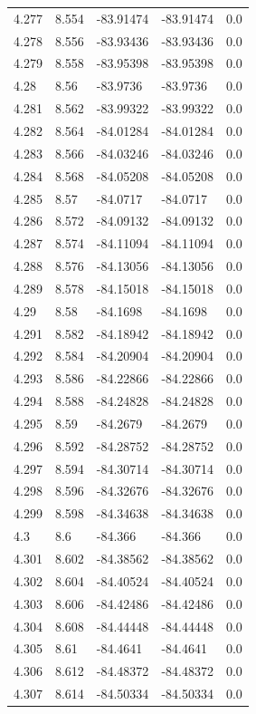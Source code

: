 \begin{tabular}{lllll}
4.277 & 8.554 & -83.91474 & -83.91474 & 0.0 \\
4.278 & 8.556 & -83.93436 & -83.93436 & 0.0 \\
4.279 & 8.558 & -83.95398 & -83.95398 & 0.0 \\
4.28 & 8.56 & -83.9736 & -83.9736 & 0.0 \\
4.281 & 8.562 & -83.99322 & -83.99322 & 0.0 \\
4.282 & 8.564 & -84.01284 & -84.01284 & 0.0 \\
4.283 & 8.566 & -84.03246 & -84.03246 & 0.0 \\
4.284 & 8.568 & -84.05208 & -84.05208 & 0.0 \\
4.285 & 8.57 & -84.0717 & -84.0717 & 0.0 \\
4.286 & 8.572 & -84.09132 & -84.09132 & 0.0 \\
4.287 & 8.574 & -84.11094 & -84.11094 & 0.0 \\
4.288 & 8.576 & -84.13056 & -84.13056 & 0.0 \\
4.289 & 8.578 & -84.15018 & -84.15018 & 0.0 \\
4.29 & 8.58 & -84.1698 & -84.1698 & 0.0 \\
4.291 & 8.582 & -84.18942 & -84.18942 & 0.0 \\
4.292 & 8.584 & -84.20904 & -84.20904 & 0.0 \\
4.293 & 8.586 & -84.22866 & -84.22866 & 0.0 \\
4.294 & 8.588 & -84.24828 & -84.24828 & 0.0 \\
4.295 & 8.59 & -84.2679 & -84.2679 & 0.0 \\
4.296 & 8.592 & -84.28752 & -84.28752 & 0.0 \\
4.297 & 8.594 & -84.30714 & -84.30714 & 0.0 \\
4.298 & 8.596 & -84.32676 & -84.32676 & 0.0 \\
4.299 & 8.598 & -84.34638 & -84.34638 & 0.0 \\
4.3 & 8.6 & -84.366 & -84.366 & 0.0 \\
4.301 & 8.602 & -84.38562 & -84.38562 & 0.0 \\
4.302 & 8.604 & -84.40524 & -84.40524 & 0.0 \\
4.303 & 8.606 & -84.42486 & -84.42486 & 0.0 \\
4.304 & 8.608 & -84.44448 & -84.44448 & 0.0 \\
4.305 & 8.61 & -84.4641 & -84.4641 & 0.0 \\
4.306 & 8.612 & -84.48372 & -84.48372 & 0.0 \\
4.307 & 8.614 & -84.50334 & -84.50334 & 0.0 \\

\end{tabular}
